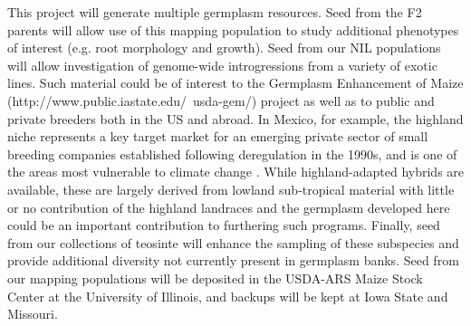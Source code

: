 This project will generate multiple germplasm resources.  Seed from the F2 parents will allow use of this mapping population to study additional phenotypes of interest (e.g. root morphology and growth).  Seed from our NIL populations will allow investigation of genome-wide introgressions from a variety of exotic lines.  Such material could be of interest to the Germplasm Enhancement of Maize (http://www.public.iastate.edu/~usda-gem/) project as well as to public and private breeders both in the US and abroad. In Mexico, for example, the highland niche represents a key target market for an emerging private sector of small breeding companies established following deregulation in the 1990s, and is one of the areas most vulnerable to climate change \citep{Bellon2011}. While highland-adapted hybrids are available, these are largely derived from lowland sub-tropical material with little or no contribution of the highland landraces and the germplasm developed here could be an important contribution to furthering such programs. Finally, seed from our collections of teosinte will enhance the sampling of these subspecies and provide additional diversity not currently present in germplasm banks.  Seed from our mapping populations will be deposited in the USDA-ARS Maize Stock Center at the University of Illinois, and backups will be kept at Iowa State and Missouri.




